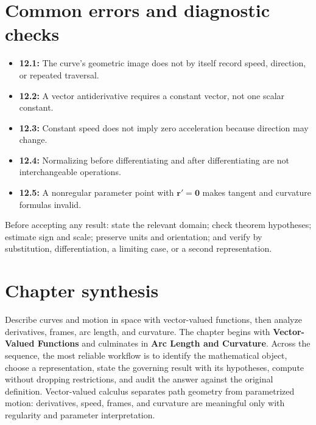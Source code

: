 \documentclass[11pt]{article}
\begin{document}
\section{Common errors and diagnostic checks}
\begin{warningbox}
\begin{itemize}
\item \textbf{12.1:} The curve's geometric image does not by itself record speed, direction, or repeated traversal.
\item \textbf{12.2:} A vector antiderivative requires a constant vector, not one scalar constant.
\item \textbf{12.3:} Constant speed does not imply zero acceleration because direction may change.
\item \textbf{12.4:} Normalizing before differentiating and after differentiating are not interchangeable operations.
\item \textbf{12.5:} A nonregular parameter point with $\mathbf r'=\mathbf0$ makes tangent and curvature formulas invalid.
\end{itemize}
\end{warningbox}
\begin{checkbox}
Before accepting any result: state the relevant domain; check theorem hypotheses; estimate sign and scale; preserve units and orientation; and verify by substitution, differentiation, a limiting case, or a second representation.
\end{checkbox}

\section{Chapter synthesis}
Describe curves and motion in space with vector-valued functions, then analyze derivatives, frames, arc length, and curvature. The chapter begins with \textbf{Vector-Valued Functions} and culminates in \textbf{Arc Length and Curvature}. Across the sequence, the most reliable workflow is to identify the mathematical object, choose a representation, state the governing result with its hypotheses, compute without dropping restrictions, and audit the answer against the original definition. Vector-valued calculus separates path geometry from parametrized motion: derivatives, speed, frames, and curvature are meaningful only with regularity and parameter interpretation.
\end{document}
